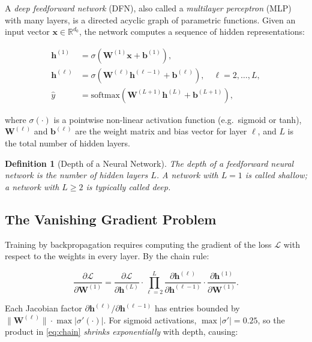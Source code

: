 \documentclass[12pt,a4paper]{article}
\newtheorem{definition}{Definition}[section]
\newcommand{\loss}{\mathcal{L}}
\newcommand{\W}{\mathbf{W}}
\newcommand{\x}{\mathbf{x}}
\newcommand{\h}{\mathbf{h}}
\begin{document}
A \emph{deep feedforward network} (DFN), also called a \emph{multilayer
perceptron} (MLP) with many layers, is a directed acyclic graph of parametric
functions.  Given an input vector $\x \in \mathbb{R}^{d_0}$, the network
computes a sequence of hidden representations:

\begin{align}
  \h^{(1)} &= \sigma\!\left(\W^{(1)}\x + \mathbf{b}^{(1)}\right), \label{eq:h1} \\
  \h^{(\ell)} &= \sigma\!\left(\W^{(\ell)}\h^{(\ell-1)} + \mathbf{b}^{(\ell)}\right),
               \quad \ell = 2, \ldots, L, \label{eq:hl} \\
  \hat{y} &= \text{softmax}\!\left(\W^{(L+1)}\h^{(L)} + \mathbf{b}^{(L+1)}\right), \label{eq:yhat}
\end{align}

where $\sigma(\cdot)$ is a pointwise non-linear activation function
(e.g.\ sigmoid or tanh), $\W^{(\ell)}$ and $\mathbf{b}^{(\ell)}$ are the
weight matrix and bias vector for layer $\ell$, and $L$ is the total number
of hidden layers.

\begin{definition}[Depth of a Neural Network]
\label{def:depth}
  The \emph{depth} of a feedforward neural network is the number of
  \emph{hidden} layers $L$.  A network with $L = 1$ is called \emph{shallow};
  a network with $L \geq 2$ is typically called \emph{deep}.
\end{definition}

\subsection{The Vanishing Gradient Problem}

Training by backpropagation requires computing the gradient of the loss
$\loss$ with respect to the weights in every layer.  By the chain rule:

\begin{equation}
  \frac{\partial \loss}{\partial \W^{(1)}} =
  \frac{\partial \loss}{\partial \h^{(L)}} \cdot
  \prod_{\ell=2}^{L} \frac{\partial \h^{(\ell)}}{\partial \h^{(\ell-1)}} \cdot
  \frac{\partial \h^{(1)}}{\partial \W^{(1)}}.
  \label{eq:chain}
\end{equation}

Each Jacobian factor $\partial \h^{(\ell)}/\partial \h^{(\ell-1)}$ has entries
bounded by $\|\W^{(\ell)}\| \cdot \max|\sigma'(\cdot)|$.  For sigmoid
activations, $\max|\sigma'| = 0.25$, so the product in \cref{eq:chain}
\emph{shrinks exponentially} with depth, causing:
\end{document}
